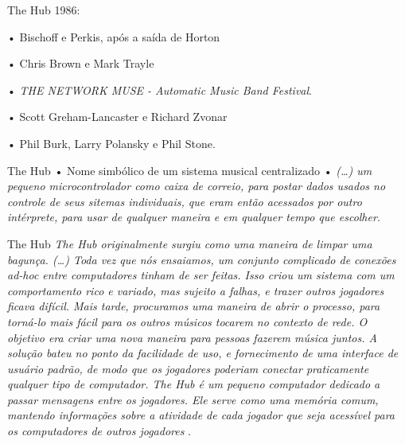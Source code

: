 \documentclass[aspectratio=169]{beamer}
\begin{document}
\begin{frame}{The Hub}
1986:

• Bischoff e Perkis, após a saída de Horton

• Chris Brown e Mark Trayle

• \emph{THE NETWORK MUSE - Automatic Music Band Festival}. 

• Scott Greham-Lancaster e Richard Zvonar 

• Phil Burk, Larry Polansky e Phil Stone.
\end{frame}

\begin{frame}{The Hub}
• Nome simbólico de um sistema musical centralizado
• \emph{(\ldots) um pequeno microcontrolador como caixa de correio, para postar dados usados no controle de seus sitemas individuais, que eram então acessados por outro intérprete, para usar de qualquer maneira e em qualquer tempo que escolher.}
\end{frame}

\begin{frame}{The Hub}
\emph{\emph{The Hub} originalmente surgiu como uma maneira de limpar uma bagunça. (\ldots) Toda vez que nós ensaiamos, um conjunto complicado de conexões \emph{ad-hoc} entre computadores tinham de ser feitas. Isso criou um sistema com um comportamento rico e variado, mas sujeito a falhas, e trazer outros jogadores ficava difícil. Mais tarde, procuramos uma maneira de abrir o processo, para torná-lo mais fácil para os outros músicos tocarem no contexto de rede. O objetivo era criar uma nova maneira para pessoas fazerem música juntos. A solução bateu no ponto da facilidade de uso, e fornecimento de uma interface de usuário padrão, de modo que os jogadores poderiam conectar praticamente qualquer tipo de computador. \emph{The Hub} é um pequeno computador dedicado a passar mensagens entre os jogadores. Ele serve como uma memória comum, mantendo informações sobre a atividade de cada jogador que seja acessível para os computadores de outros jogadores} \cite[seção 2.1]{brown_indigenous_2013}. 
\end{frame}
\end{document}
